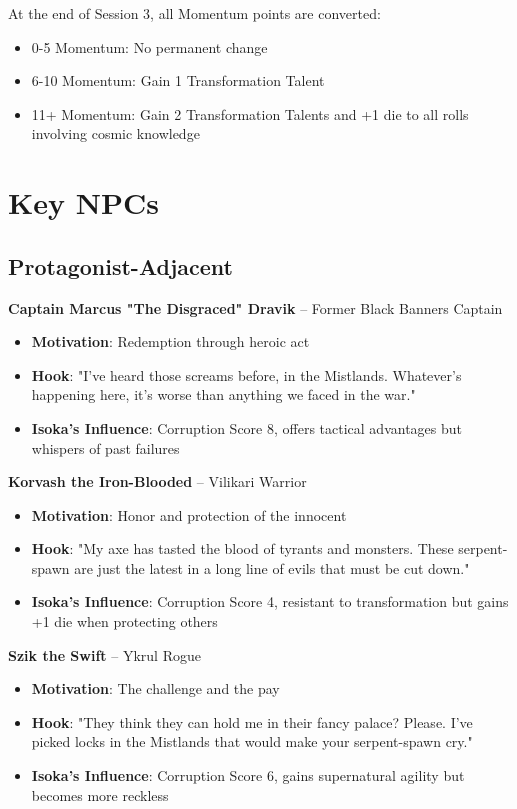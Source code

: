 \documentclass[11pt]{article}
\begin{document}
At the end of Session 3, all Momentum points are converted:
\begin{itemize}[leftmargin=*]
    \item 0-5 Momentum: No permanent change
    \item 6-10 Momentum: Gain 1 Transformation Talent
    \item 11+ Momentum: Gain 2 Transformation Talents and +1 die to all rolls involving cosmic knowledge
\end{itemize}

\newpage

\section{Key NPCs}

\subsection{Protagonist-Adjacent}

\textbf{Captain Marcus "The Disgraced" Dravik} – Former Black Banners Captain
\begin{itemize}[leftmargin=*]
    \item \textbf{Motivation}: Redemption through heroic act
    \item \textbf{Hook}: "I've heard those screams before, in the Mistlands. Whatever's happening here, it's worse than anything we faced in the war."
    \item \textbf{Isoka's Influence}: Corruption Score 8, offers tactical advantages but whispers of past failures
\end{itemize}

\textbf{Korvash the Iron-Blooded} – Vilikari Warrior
\begin{itemize}[leftmargin=*]
    \item \textbf{Motivation}: Honor and protection of the innocent
    \item \textbf{Hook}: "My axe has tasted the blood of tyrants and monsters. These serpent-spawn are just the latest in a long line of evils that must be cut down."
    \item \textbf{Isoka's Influence}: Corruption Score 4, resistant to transformation but gains +1 die when protecting others
\end{itemize}

\textbf{Szik the Swift} – Ykrul Rogue
\begin{itemize}[leftmargin=*]
    \item \textbf{Motivation}: The challenge and the pay
    \item \textbf{Hook}: "They think they can hold me in their fancy palace? Please. I've picked locks in the Mistlands that would make your serpent-spawn cry."
    \item \textbf{Isoka's Influence}: Corruption Score 6, gains supernatural agility but becomes more reckless
\end{itemize}
\end{document}
